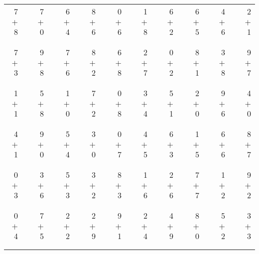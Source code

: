 \documentclass[12pt, letterpaper]{article}
\begin{document}
\begin{tabular}{rrrrrrrrrrrrrrrrrrr}
7 & & 7 & & 6 & & 8 & & 0 & & 1 & & 6 & & 6 & & 4 & & 2\\
$+$ 8 & & $+$ 0 & & $+$ 4 & & $+$ 6 & & $+$ 6 & & $+$ 8 & & $+$ 2 & & $+$ 5 & & $+$ 6 & & $+$ 1\\
\cline{1-1} \cline{3-3} \cline{5-5} \cline{7-7} \cline{9-9} \cline{11-11} \cline{13-13} \cline{15-15} \cline{17-17} \cline{19-19} \\ \\
7 & & 9 & & 7 & & 8 & & 6 & & 2 & & 0 & & 8 & & 3 & & 9\\
$+$ 3 & & $+$ 8 & & $+$ 6 & & $+$ 2 & & $+$ 8 & & $+$ 7 & & $+$ 2 & & $+$ 1 & & $+$ 8 & & $+$ 7\\
\cline{1-1} \cline{3-3} \cline{5-5} \cline{7-7} \cline{9-9} \cline{11-11} \cline{13-13} \cline{15-15} \cline{17-17} \cline{19-19} \\ \\
1 & & 5 & & 1 & & 7 & & 0 & & 3 & & 5 & & 2 & & 9 & & 4\\
$+$ 1 & & $+$ 8 & & $+$ 0 & & $+$ 2 & & $+$ 8 & & $+$ 4 & & $+$ 1 & & $+$ 0 & & $+$ 6 & & $+$ 0\\
\cline{1-1} \cline{3-3} \cline{5-5} \cline{7-7} \cline{9-9} \cline{11-11} \cline{13-13} \cline{15-15} \cline{17-17} \cline{19-19} \\ \\
4 & & 9 & & 5 & & 3 & & 0 & & 4 & & 6 & & 1 & & 6 & & 8\\
$+$ 1 & & $+$ 0 & & $+$ 4 & & $+$ 0 & & $+$ 7 & & $+$ 5 & & $+$ 3 & & $+$ 5 & & $+$ 6 & & $+$ 7\\
\cline{1-1} \cline{3-3} \cline{5-5} \cline{7-7} \cline{9-9} \cline{11-11} \cline{13-13} \cline{15-15} \cline{17-17} \cline{19-19} \\ \\
0 & & 3 & & 5 & & 3 & & 8 & & 1 & & 2 & & 7 & & 1 & & 9\\
$+$ 3 & & $+$ 6 & & $+$ 3 & & $+$ 2 & & $+$ 3 & & $+$ 6 & & $+$ 6 & & $+$ 7 & & $+$ 2 & & $+$ 2\\
\cline{1-1} \cline{3-3} \cline{5-5} \cline{7-7} \cline{9-9} \cline{11-11} \cline{13-13} \cline{15-15} \cline{17-17} \cline{19-19} \\ \\
0 & & 7 & & 2 & & 2 & & 9 & & 2 & & 4 & & 8 & & 5 & & 3\\
$+$ 4 & & $+$ 5 & & $+$ 2 & & $+$ 9 & & $+$ 1 & & $+$ 4 & & $+$ 9 & & $+$ 0 & & $+$ 2 & & $+$ 3\\
\cline{1-1} \cline{3-3} \cline{5-5} \cline{7-7} \cline{9-9} \cline{11-11} \cline{13-13} \cline{15-15} \cline{17-17} \cline{19-19} \\ \\

\end{tabular}
\end{document}
